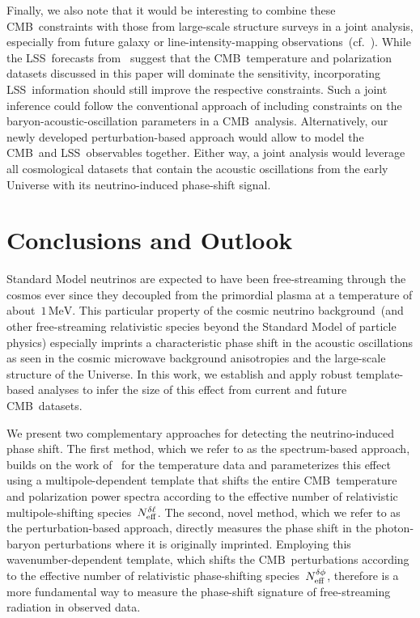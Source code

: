 Finally, we also note that it would be interesting to combine these CMB~constraints with those from large-scale structure surveys in a joint analysis, especially from future galaxy or line-intensity-mapping observations~(cf.~\cite{CosmicVisions21cm:2018rfq, PUMA:2019jwd, Karkare:2022bai, DESI:2022lza, Schlegel:2022vrv}). While the LSS~forecasts from~\cite{Baumann:2017gkg} suggest that the CMB~temperature and polarization datasets discussed in this paper will dominate the sensitivity, incorporating LSS~information should still improve the respective constraints. Such a joint inference could follow the conventional approach of including constraints on the baryon-acoustic-oscillation parameters in a CMB~analysis. Alternatively, our newly developed perturbation-based approach would allow to model the CMB~and LSS~observables together. Either way, a joint analysis would leverage all cosmological datasets that contain the acoustic oscillations from the early Universe with its neutrino-induced phase-shift signal.




\section{Conclusions and Outlook}
\label{ch12-sec:conclusions}

Standard Model neutrinos are expected to have been free-streaming through the cosmos ever since they decoupled from the primordial plasma at a temperature of about~$1\,\mathrm{MeV}$. This particular property of the cosmic neutrino background~(and other free-streaming relativistic species beyond the Standard Model of particle physics) especially imprints a characteristic phase shift in the acoustic oscillations as seen in the cosmic microwave background anisotropies and the large-scale structure of the Universe. In this work, we establish and apply robust template-based analyses to infer the size of this effect from current and future CMB~datasets.\medskip

We present two complementary approaches for detecting the neutrino-induced phase shift. The first method, which we refer to as the spectrum-based approach, builds on the work of~\cite{Follin:2015hya} for the temperature data and parameterizes this effect using a multipole-dependent template that shifts the entire CMB~temperature and polarization power spectra according to the effective number of relativistic multipole-shifting species~$N_\mathrm{eff}^{\delta\ell}$. The second, novel method, which we refer to as the perturbation-based approach, directly measures the phase shift in the photon-baryon perturbations where it is originally imprinted. Employing this wavenumber-dependent template, which shifts the CMB~perturbations according to the effective number of relativistic phase-shifting species~$N_\mathrm{eff}^{\delta\phi}$, therefore is a more fundamental way to measure the phase-shift signature of free-streaming radiation in observed data.

